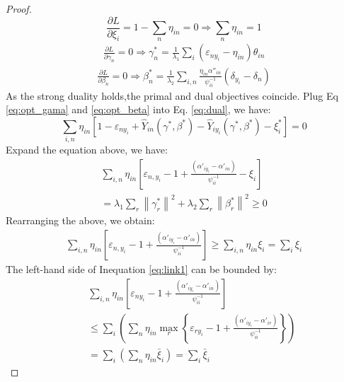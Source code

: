 \begin{proof}
\begin{equation}
\frac{{\partial L}}{{\partial {\xi _i}}} = 1 - \sum\limits_n {{\eta _{in}}}  = 0 \Rightarrow \sum\limits_n {{\eta _{in}}}  = 1
\end{equation}   
\begin{eqnarray}\label{eq:opt_gama}
\frac{{\partial L}}{{\partial {\gamma _n}}} = 0  
\Rightarrow  \gamma _n^* = \frac{1}{{{\lambda _1}}}\sum\limits_i {\left( {{\varepsilon _{n{y_i}}} - {\eta _{in}}} \right){\theta _{in}}} 
\end{eqnarray}
\begin{eqnarray}\label{eq:opt_beta}
\frac{{\partial L}}{{\partial {\beta _n}}}  = 0 
\Rightarrow \beta _n^* = \frac{1}{{{\lambda _2}}}\sum\limits_{i,n} {\frac{{{\eta _{in}}{{\alpha ''}_{in}}}}{{\psi _{ii}^{ - 1}}}\left( {{\delta _{{y_i}}} - {\delta _n}} \right)} 
\end{eqnarray}
As the strong duality holds,the primal and dual objectives coincide. Plug Eq \eqref{eq:opt_gama} and \eqref{eq:opt_beta} into Eq. \eqref{eq:dual}, we have:
\begin{equation*}
\sum\limits_{i,n} {{\eta _{in}}\left[ {1 - {\varepsilon _{n{y_i}}} + {{\hat Y}_{in}}\left( {\gamma^* ,\beta^* } \right) - {{\hat Y}_{i{y_i}}}\left( {\gamma^* ,\beta^* } \right) - {\xi _i^*}} \right]}=0
\end{equation*}
Expand the equation above, we have:
\begin{eqnarray}\nonumber
\sum\limits_{i,n} {{\eta _{in}}\left[ { {\varepsilon _{n,{y_i}}}-1 + \frac{{\left( {{{\alpha '}_{i{y_i}}} - {{\alpha '}_{in}}} \right)}}{{\psi_{ii}^{ - 1}}} - {\xi _i}} \right]} \nonumber\\ 
= {\lambda _1}\sum\limits_r {{{\left\| {\gamma _r^*} \right\|}^2}}  + {\lambda _2}\sum\limits_r {{{\left\| {\beta _r^*} \right\|}^2}}  \ge 0\nonumber
\end{eqnarray}
Rearranging the above, we obtain:
\begin{eqnarray}\label{eq:link1}
\sum\limits_{i,n} {{\eta _{in}}\left[ { {\varepsilon _{n,{y_i}}} -1+ \frac{{\left( {{{\alpha '}_{i{y_i}}} - {{\alpha '}_{in}}} \right)}}{{\psi_{ii}^{ - 1}}}} \right]}  
 \ge \sum\limits_{i,n} {{\eta _{in}}{\xi _i}}  = \sum\limits_i {{\xi _i}} 
\end{eqnarray}
The left-hand side of Inequation \eqref{eq:link1} can be bounded by:
\begin{eqnarray}
&&\sum\limits_{i,n} {{\eta _{in}}\left[ { {\varepsilon _{n{y_i}}}-1 + \frac{{\left( {{{\alpha '}_{i{y_i}}} - {{\alpha '}_{in}}} \right)}}{{\psi_{ii}^{ - 1}}}} \right]} \nonumber\\ &&\le \sum\limits_i {\left( {\sum\limits_n {{\eta _{in}}\mathop {\max }\limits_r \left\{ { {\varepsilon _{r{y_i}}} -1 + \frac{{\left( {{{\alpha '}_{i{y_i}}} - {{\alpha '}_{ir}}} \right)}}{{\psi_{ii}^{ - 1}}}} \right\}} } \right)}  \nonumber\\
&&= \sum\limits_i {\left( {\sum\limits_n {{\eta _{in}}{{\bar \xi }_i}} } \right)}  = \sum\limits_i {\bar \xi_i }
\end{eqnarray}
\end{proof}